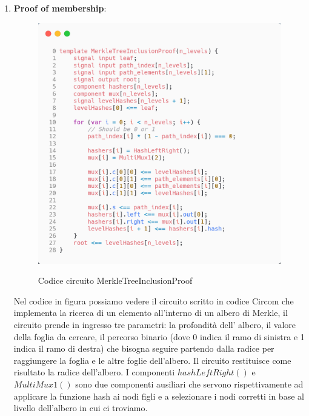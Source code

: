 \begin{enumerate}
    \item \textbf{Proof of membership}:
    \begin{figure}[H]
        \centering
        \includegraphics[width=12cm]{./chapters/3.poc/images/1.merkle_proof.png}
        \label{fig:merkle_proof_code}
        \captionsetup{justification=centering}
        \caption{Codice circuito MerkleTreeInclusionProof}
    \end{figure}
    Nel codice in figura possiamo vedere il circuito scritto in codice Circom che implementa la ricerca di un elemento
    all'interno di un albero di Merkle, il circuito prende in ingresso tre parametri: la profondità dell' albero, il
    valore della foglia da cercare, il percorso binario (dove 0 indica il ramo di sinistra e 1 indica il ramo di destra)
    che bisogna seguire partendo dalla radice per raggiungere la foglia e le altre foglie dell'albero. Il circuito
    restituisce come risultato la radice dell'albero. I componenti $hashLeftRight()$ e $MultiMux1()$ sono due
    componenti ausiliari che servono rispettivamente ad applicare la funzione hash ai nodi figli e a selezionare i nodi
    corretti in base al livello dell'albero in cui ci troviamo.


\end{enumerate}
